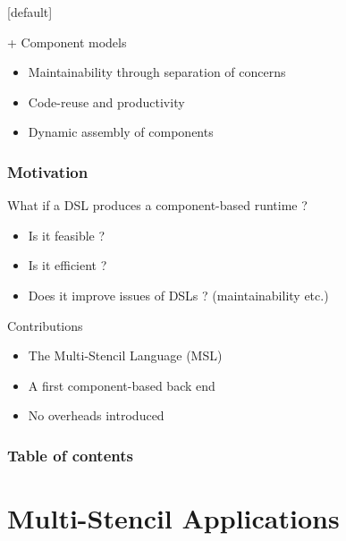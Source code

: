 \documentclass{beamer}
\makeatletter
\newenvironment{withoutheadline}{
        \setbeamertemplate{headline}[default]
        \def\beamer@entrycode{\vspace*{-\headheight}}
    }{}
\makeatother
\begin{document}
\begin{withoutheadline}
\begin{frame}
\begin{block}{+ Component models}
\begin{itemize}
\item Maintainability through separation of concerns
\item Code-reuse and productivity
\item Dynamic assembly of components
\end{itemize}
\end{block}
\end{frame}
\begin{frame}
\frametitle{Motivation} %
\begin{tcolorbox}[width=\textwidth,title={Motivation}]
What if a DSL produces a component-based runtime ?
\begin{itemize}
\item Is it feasible ?
\item Is it efficient ?
\item Does it improve issues of DSLs ? (maintainability etc.)
\end{itemize}
\end{tcolorbox}

\begin{block}{Contributions}
\begin{itemize}
\item The Multi-Stencil Language (MSL)
\item A first component-based back end
\item No overheads introduced
\end{itemize}
\end{block}

\end{frame}

\begin{frame}
\frametitle{Table of contents}
    \tableofcontents[hideallsubsections]
\end{frame}

\end{withoutheadline}

\section{Multi-Stencil Applications}
\end{document}
